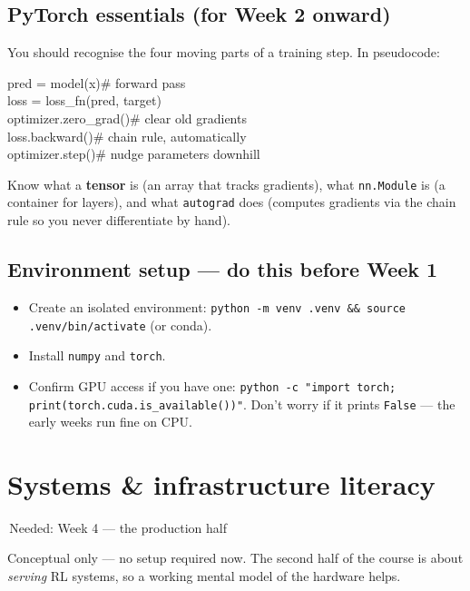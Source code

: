 \documentclass[11pt]{article}
\newcommand{\wk}[1]{{\sffamily\footnotesize\colorbox{slate!12}{\textcolor{slate}{\,Needed: #1\,}}}}
\begin{document}
\subsection{PyTorch essentials (for Week 2 onward)}
\begin{intuition}
You should recognise the four moving parts of a training step. In pseudocode:
\end{intuition}
\begin{solbox}
\ttfamily\small
pred = model(x)\qquad\textcolor{ink3}{\# forward pass}\\
loss = loss\_fn(pred, target)\\
optimizer.zero\_grad()\quad\textcolor{ink3}{\# clear old gradients}\\
loss.backward()\qquad\quad\textcolor{ink3}{\# chain rule, automatically}\\
optimizer.step()\qquad\quad\textcolor{ink3}{\# nudge parameters downhill}
\end{solbox}
Know what a \textbf{tensor} is (an array that tracks gradients), what \texttt{nn.Module} is (a container for layers), and what \texttt{autograd} does (computes gradients via the chain rule so you never differentiate by hand).

\subsection{Environment setup — do this before Week 1}
\begin{itemize}
\item Create an isolated environment: \texttt{python -m venv .venv \&\& source .venv/bin/activate} (or conda).
\item Install \texttt{numpy} and \texttt{torch}.
\item Confirm GPU access if you have one: \texttt{python -c "import torch; print(torch.cuda.is\_available())"}. Don't worry if it prints \texttt{False} — the early weeks run fine on CPU.
\end{itemize}

\section{Systems \& infrastructure literacy}
\wk{Week 4 — the production half}

\vspace{0.4em}
Conceptual only — no setup required now. The second half of the course is about \emph{serving} RL systems, so a working mental model of the hardware helps.
\end{document}
